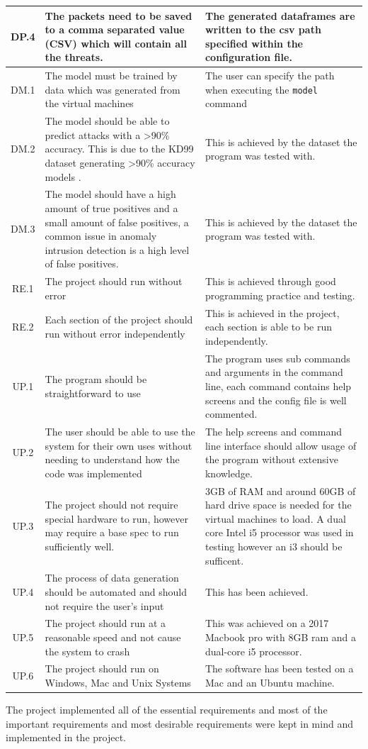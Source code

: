 \begin{tabularx}{\textwidth}{|c|X|X|}
     \hline
     DP.4 & The packets need to be saved to a comma separated value (CSV) which will contain all the threats. & The generated dataframes are written to the csv path specified within the configuration file.\\
     \hline
     DM.1 & The model must be trained by data which was generated from the virtual machines & The user can specify the path when executing the \texttt{model} command\\
     \hline
     DM.2 & The model should be able to predict attacks with a >90\% accuracy. This is due to the KD99 dataset generating >90\% accuracy models \cite{SANGKATSANEE20112227} \cite{Peddabachigari} \cite{bouzida}. & This is achieved by the dataset the program was tested with.\\
     \hline
     DM.3 & The model should have a high amount of true positives and a small amount of false positives, a common issue in anomaly intrusion detection is a high level of false positives. & This is achieved by the dataset the program was tested with.\\
     \hline
     RE.1  & The project should run without error & This is achieved through good programming practice and testing.\\ 
     \hline
     RE.2 & Each section of the project should run without error independently & This is achieved in the project, each section is able to be run independently.\\
     \hline
     UP.1 & The program should be straightforward to use & The program uses sub commands and arguments in the command line, each command contains help screens and the config file is well commented. \\
     \hline
     UP.2 & The user should be able to use the system for their own uses without needing to understand how the code was implemented & The help screens and command line interface should allow usage of the program without extensive knowledge.\\
     \hline
     UP.3 & The project should not require special hardware to run, however may require a base spec to run sufficiently well. & 3GB of RAM and around 60GB of hard drive space is needed for the virtual machines to load. A dual core Intel i5 processor was used in testing however an i3 should be sufficent.\\
     \hline
     UP.4 & The process of data generation should be automated and should not require the user’s input & This has been achieved.\\
     \hline
     UP.5 & The project should run at a reasonable speed and not cause the system to crash & This was achieved on a 2017 Macbook pro with 8GB ram and a dual-core i5 processor.\\
     \hline
     UP.6  & The project should run on Windows, Mac and Unix Systems & The software has been tested on a Mac and an Ubuntu machine.\\
     \hline
\end{tabularx}
The project implemented all of the essential requirements and most of the important requirements and most desirable requirements were kept in mind and implemented in the project.
